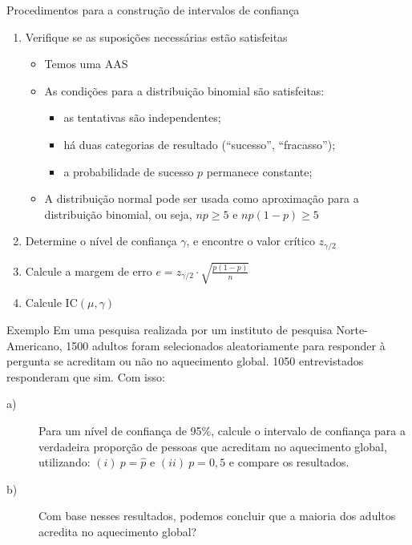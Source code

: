 \documentclass[14pt,aspectratio=1610]{beamer}
\begin{document}
	\begin{frame}{Procedimentos para a construção de intervalos de confiança}
		\begin{block}{}
			\justifying
			\begin{enumerate}
				\item Verifique se as suposições necessárias estão satisfeitas
				\begin{itemize}
					\item Temos uma AAS
					\item As condições para a distribuição binomial são satisfeitas:
					\begin{itemize}
						\item as tentativas são independentes;
						\item há duas categorias de resultado (``sucesso'', ``fracasso'');
						\item a probabilidade de sucesso $p$ permanece constante;
					\end{itemize}
					\item A distribuição normal pode ser usada como aproximação para a    distribuição binomial, ou seja, $np \geq 5$ e $np(1-p) \geq 5$
				\end{itemize}
				
				\item Determine o nível de confiança $\gamma$, e encontre o valor crítico $z_{\gamma/2}$
				\item Calcule a margem de erro $e = z_{\gamma/2} \cdot \sqrt{\frac{p(1-p)}{n}}$
				\item Calcule $\text{IC}(\mu, \gamma)$
			\end{enumerate}   
		\end{block}
	\end{frame}
	
	\begin{frame}{}
		\begin{block}{Exemplo}
			\justifying
			Em uma pesquisa realizada por um instituto de pesquisa Norte-Americano, 1500 adultos foram selecionados aleatoriamente para responder à pergunta se acreditam ou não no aquecimento global. 1050 entrevistados responderam que sim. Com isso:
			
			\begin{description}
				\item[a)~]Para um nível de confiança de 95\%, calcule o intervalo de confiança para a verdadeira proporção de pessoas que acreditam no aquecimento global, utilizando:
				$(i)\ p = \hat{p} \text{ e } (ii)\ p = 0,5$ e compare os resultados.
				\item[b)~]Com base nesses resultados, podemos concluir que a maioria dos adultos acredita no aquecimento global?
			\end{description}   
		\end{block}
	\end{frame}
	
\end{document}
